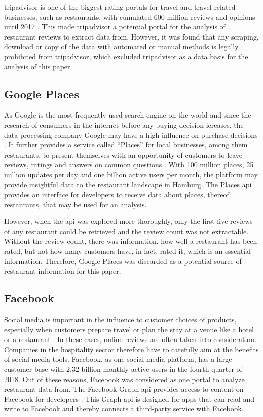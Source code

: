 \documentclass[a4paper, 11pt, oneside]{Thesis}  %
\begin{document}
tripadvisor is one of the biggest rating portals for travel and travel related businesses, such as restaurants, with cumulated 600 million reviews and opinions until 2017 \cite{StephenKaufer.27.04.2018}. This made tripadvisor a potential portal for the analysis of restaurant reviews to extract data from. However, it was found that any scraping, download or copy of the data with automated or manual methods is legally prohibited from tripadvisor, which excluded tripadvisor as a data basis for the analysis of this paper.

\subsection{Google Places}

As Google is the most frequently used search engine on the world and since the research of consumers in the internet before any buying decision icreases, the data processing company Google may have a high influence on purchase decisions \cite{Zhao.2018} \cite{Shim.2001}. It further provides a service called ``Places'' for local businesses, among them restaurants, to present themselves with an opportunity of customers to leave reviews, ratings and answers on common questions \cite{GooglePlaces}. With 100 million places, 25 million updates per day and one billion active users per month, the platform may provide insightful data to the restaurant landscape in Hamburg. The Places \ac{api} provides an interface for developers to receive data about places, thereof restaurants, that may be used for an analysis. 

However, when the \ac{api} was explored more thoroughly, only the first five reviews of any restaurant could be retrieved and the review count was not extractable. Without the review count, there was information, how well a restaurant has been rated, but not how many customers have, in fact, rated it, which is an essential information. Therefore, Google Places was discarded as a potential source of restaurant information for this paper.

\subsection{Facebook}

Social media is important in the influence to customer choices of products, especially when customers prepare travel or plan the stay at a venue like a hotel or a restaurant \cite{Kwok.2013}. In these cases, online reviews are often taken into consideration. Companies in the hospitality sector therefore have to carefully aim at the benefits of social media tools. Facebook, as one social media platform, has a large customer base with 2.32 billion monthly active users in the fourth quarter of 2018\cite{statista.facebook.2019}. Out of these reasons, Facebook was considered as one portal to analyze restaurant data from. The Facebook Graph \ac{api} provides access to content on Facebook for developers \cite{facebook.graph.2019}. This Graph \ac{api} is designed for apps that can read and write to Facebook and thereby connects a third-party service with Facebook.
\end{document}
